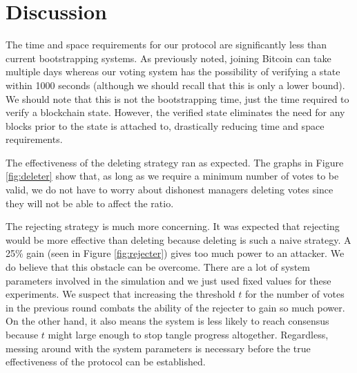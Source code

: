 \section{Discussion}
\label{sec:discussion}


The time and space requirements for our protocol are significantly less than current bootstrapping systems.
As previously noted, joining Bitcoin can take multiple days whereas our voting system has the possibility of verifying a state within 1000 seconds (although we should recall that this is only a lower bound).
We should note that this is not the bootstrapping time, just the time required to verify a blockchain state.
However, the verified state eliminates the need for any blocks prior to the state is attached to, drastically reducing time and space requirements.

The effectiveness of the deleting strategy ran as expected.
The graphs in Figure \ref{fig:deleter} show that, as long as we require a minimum number of votes to be valid, we do not have to worry about dishonest managers deleting votes since they will not be able to affect the ratio.

The rejecting strategy is much more concerning.
It was expected that rejecting would be more effective than deleting because deleting is such a naive strategy.
A 25\% gain (seen in Figure \ref{fig:rejecter}) gives too much power to an attacker.
We do believe that this obstacle can be overcome.
There are a lot of system parameters involved in the simulation and we just used fixed values for these experiments.
We suspect that increasing the threshold $t$ for the number of votes in the previous round combats the ability of the rejecter to gain so much power.
On the other hand, it also means the system is less likely to reach consensus because $t$ might large enough to stop tangle progress altogether.
Regardless, messing around with the system parameters is necessary before the true effectiveness of the protocol can be established.